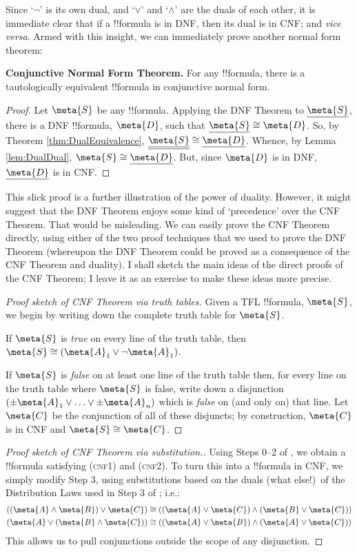 \documentclass[../../../include/open-logic-section]{subfiles}
\begin{document}
Since `$\lnot$' is its own dual, and `$\lor$' and `$\land$' are the duals of each other, it is immediate clear that if a !!{formula} is in DNF, then its dual is in CNF; and \emph{vice versa}. Armed with this insight, we can immediately prove another normal form theorem:
	\begin{thm}\label{thm:cnf}\textbf{Conjunctive Normal Form Theorem.} For any !!{formula}, there is a tautologically equivalent !!{formula} in conjunctive normal form.
\begin{proof}
	Let $\meta{S}$ be any !!{formula}. Applying the DNF Theorem to $\dual{\meta{S}}$, there is a DNF !!{formula}, $\meta{D}$, such that $\dual{\meta{S}} \cong \meta{D}$. So, by Theorem \ref{thm:DualEquivalence}, $\dual{\dual{\meta{S}}} \cong \dual{\meta{D}}$. Whence, by Lemma \ref{lem:DualDual}, $\meta{S} \cong \dual{\meta{D}}$. But, since $\meta{D}$ is in DNF, $\dual{\meta{D}}$ is in CNF. 	
\end{proof}
\end{thm}\noindent
This slick proof is a further illustration of the power of duality. However, it might suggest that the DNF Theorem enjoys some kind of `precedence' over the CNF Theorem. That would be misleading.  We can easily prove the CNF Theorem directly, using either of the two proof techniques that we used to prove the DNF Theorem (whereupon the DNF Theorem could be proved as a consequence of the CNF Theorem and duality). I shall sketch the main ideas of the direct proofs of the CNF Theorem; I leave it as an exercise to make these ideas more precise.
\begin{proof}[Proof sketch of CNF Theorem via truth tables]
	Given a TFL !!{formula}, $\meta{S}$, we begin by writing down the complete truth table for $\meta{S}$.
	
	If $\meta{S}$ is \emph{true} on every line of the truth table, then $\meta{S} \cong (\meta{A}_1 \lor \lnot \meta{A}_1)$.
	
	If $\meta{S}$ is \emph{false} on at least one line of the truth table then, for every line on the truth table where $\meta{S}$ is false, write down a disjunction $(\pm\meta{A}_1 \lor \ldots \lor \pm\meta{A}_n)$ which is \emph{false} on (and only on) that line. Let $\meta{C}$ be the conjunction of all of these disjuncts; by construction, $\meta{C}$ is in CNF and $\meta{S} \cong \meta{C}$.
\end{proof}
\begin{proof}[Proof sketch of CNF Theorem via substitution.] Using Steps 0--2 of \intoDNF, we  obtain a !!{formula} satisfying (\textsc{cnf1}) and (\textsc{cnf2}). To turn this into a !!{formula} in CNF, we simply modify Step 3, using substitutions based on the duals (what else!)\ of the Distribution Laws used in Step 3 of \intoDNF{}; i.e.:
	\begin{align*}
		((\meta{A} \land \meta{B}) \lor \meta{C}) &\cong ((\meta{A} \lor \meta{C}) \land (\meta{B} \lor \meta{C}))\\
		(\meta{A} \lor (\meta{B} \land \meta{C})) &\cong ((\meta{A} \lor \meta{B}) \land (\meta{A} \lor \meta{C}))	
	\end{align*}
This allows us to pull conjunctions outside the scope of any disjunction.
\end{proof}\noindent
\end{document}
